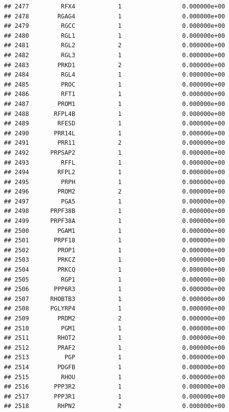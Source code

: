 \documentclass[
]{article}
\begin{document}
\begin{verbatim}
## 2477         RFX4            1                 0.000000e+00
## 2478        RGAG4            1                 0.000000e+00
## 2479         RGCC            1                 0.000000e+00
## 2480         RGL1            1                 0.000000e+00
## 2481         RGL2            2                 0.000000e+00
## 2482         RGL3            1                 0.000000e+00
## 2483        PRKD1            2                 0.000000e+00
## 2484         RGL4            1                 0.000000e+00
## 2485         PROC            1                 0.000000e+00
## 2486         RFT1            1                 0.000000e+00
## 2487        PROM1            1                 0.000000e+00
## 2488       RFPL4B            1                 0.000000e+00
## 2489        RFESD            1                 0.000000e+00
## 2490       PRR14L            1                 0.000000e+00
## 2491        PRR11            2                 0.000000e+00
## 2492      PRPSAP2            1                 0.000000e+00
## 2493         RFFL            1                 0.000000e+00
## 2494        RFPL2            1                 0.000000e+00
## 2495         PRPH            1                 0.000000e+00
## 2496        PROM2            2                 0.000000e+00
## 2497         PGA5            1                 0.000000e+00
## 2498      PRPF38B            1                 0.000000e+00
## 2499      PRPF38A            1                 0.000000e+00
## 2500        PGAM1            1                 0.000000e+00
## 2501       PRPF18            1                 0.000000e+00
## 2502        PROP1            1                 0.000000e+00
## 2503        PRKCZ            1                 0.000000e+00
## 2504        PRKCQ            1                 0.000000e+00
## 2505         RGP1            1                 0.000000e+00
## 2506       PPP6R3            1                 0.000000e+00
## 2507      RHOBTB3            1                 0.000000e+00
## 2508      PGLYRP4            1                 0.000000e+00
## 2509        PRDM2            2                 0.000000e+00
## 2510         PGM1            1                 0.000000e+00
## 2511        RHOT2            1                 0.000000e+00
## 2512        PRAF2            1                 0.000000e+00
## 2513          PGP            1                 0.000000e+00
## 2514        PDGFB            1                 0.000000e+00
## 2515         RHOU            1                 0.000000e+00
## 2516       PPP3R2            1                 0.000000e+00
## 2517       PPP3R1            1                 0.000000e+00
## 2518        RHPN2            2                 0.000000e+00

\end{verbatim}
\end{document}
